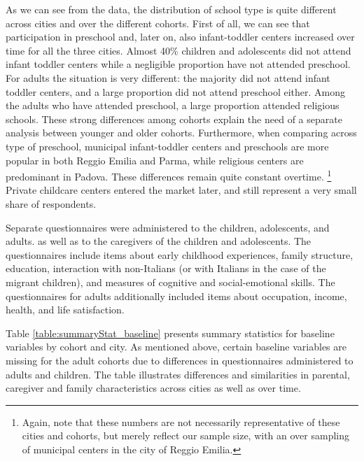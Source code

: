 \documentclass[12pt]{article}
\begin{document}
As we can see from the data, the distribution of school type is quite different across cities and over the different cohorts. First of all, we can see that participation in preschool and, later on, also infant-toddler centers increased over time for all the three cities. Almost 40\% children and adolescents did not attend infant toddler centers while a negligible proportion have not attended preschool. For adults the situation is very different: the majority did not attend infant toddler centers, and a large proportion did not attend preschool either. Among the adults who have attended preschool, a large proportion attended religious schools. These strong differences among cohorts explain the need of a separate analysis between younger and older cohorts. Furthermore, when comparing across type of preschool, municipal infant-toddler centers and preschools are more popular in both Reggio Emilia and Parma, while religious centers are predominant in Padova. These differences remain quite constant overtime. \footnote{Again, note that these numbers are not necessarily representative of these cities and cohorts, but merely reflect our sample size, with an over sampling of municipal centers in the city of Reggio Emilia.} Private childcare centers entered the market later, and still represent a very small share of respondents.

\bigskip

Separate questionnaires were administered to the children, adolescents, and adults. as well as to the caregivers of the children and adolescents. The questionnaires include items about early childhood experiences, family structure, education, interaction with non-Italians (or with Italians in the case of the migrant children), and measures of cognitive and social-emotional skills. The questionnaires for adults additionally included items about occupation, income, health, and life satisfaction. 

Table \ref{table:summaryStat_baseline} presents summary statistics for baseline variables by cohort and city. As mentioned above, certain baseline variables are missing for the adult cohorts due to differences in questionnaires administered to adults and children. The table illustrates differences and similarities in parental, caregiver and family characteristics across cities as well as over time.

\begin{landscape}

\end{landscape}
\end{document}
